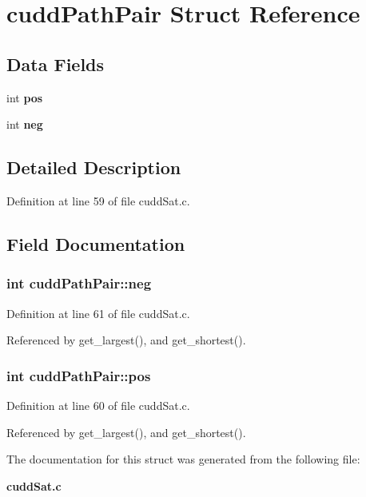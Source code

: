 \section{cudd\-Path\-Pair Struct Reference}
\label{structcuddPathPair}
\subsection*{Data Fields}
\begin{CompactItemize}
\item 
int \bf{pos}
\item 
int \bf{neg}
\end{CompactItemize}


\subsection{Detailed Description}




Definition at line 59 of file cudd\-Sat.c.

\subsection{Field Documentation}
\subsubsection{\setlength{\rightskip}{0pt plus 5cm}int \bf{cudd\-Path\-Pair::neg}}\label{structcuddPathPair_968dc3d34b592da2876517a687873281}




Definition at line 61 of file cudd\-Sat.c.

Referenced by get\_\-largest(), and get\_\-shortest().
\subsubsection{\setlength{\rightskip}{0pt plus 5cm}int \bf{cudd\-Path\-Pair::pos}}\label{structcuddPathPair_df2ec174fe645c74c4d045a9109364f4}




Definition at line 60 of file cudd\-Sat.c.

Referenced by get\_\-largest(), and get\_\-shortest().

The documentation for this struct was generated from the following file:\begin{CompactItemize}
\item 
\bf{cudd\-Sat.c}\end{CompactItemize}
